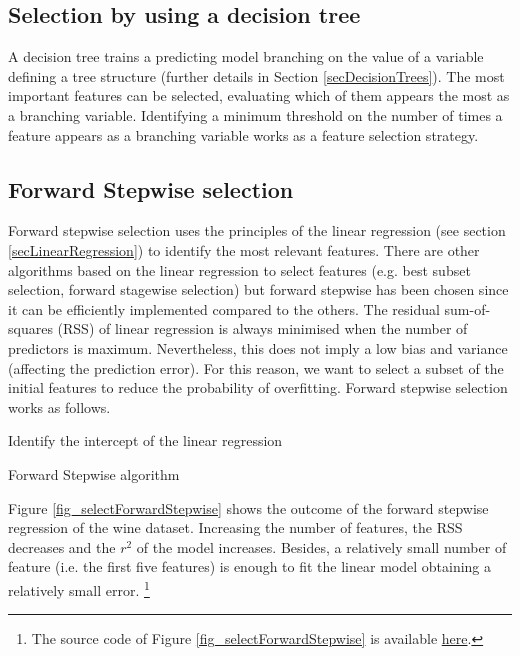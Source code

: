 \subsection{Selection by using a decision tree}
A decision tree trains a predicting model branching on the value of a variable defining a tree structure (further details in Section \ref{secDecisionTrees}). The most important features can be selected, evaluating which of them appears the most as a branching variable. Identifying a minimum threshold on the number of times a feature appears as a branching variable works as a feature selection strategy.

\subsection{Forward Stepwise selection}

Forward stepwise selection uses the principles of the linear regression (see section \ref{secLinearRegression}) to identify the most relevant features. There are other algorithms based on the linear regression to select features (e.g. best subset selection, forward stagewise selection) but forward stepwise has been chosen since it can be efficiently implemented compared to the others. The residual sum-of-squares (RSS) of linear regression is always minimised when the number of predictors is maximum. Nevertheless, this does not imply a low bias and variance (affecting the prediction error). For this reason, we want to select a subset of the initial features to reduce the probability of overfitting. Forward stepwise selection works as follows.

\begin{algorithm}[H]
\DontPrintSemicolon
\SetAlgoLined
Identify the intercept of the linear regression\;

\caption{Forward Stepwise algorithm} \label{secForwardStepwise}
\label{algo_forwardStepwise}
\end{algorithm}

Figure \ref{fig_selectForwardStepwise} shows the outcome of the forward stepwise regression of the wine dataset. Increasing the number of features, the RSS decreases and the $r^2$ of the model increases. Besides, a relatively small number of feature (i.e. the first five features) is enough to fit the linear model obtaining a relatively small error. \footnote{The source code of Figure \ref{fig_selectForwardStepwise} is available \href{https://github.com/aletuf93/logproj/blob/master/examples/05.\%20Dimensionality\%20Reduction.ipynb}{here}.} 

